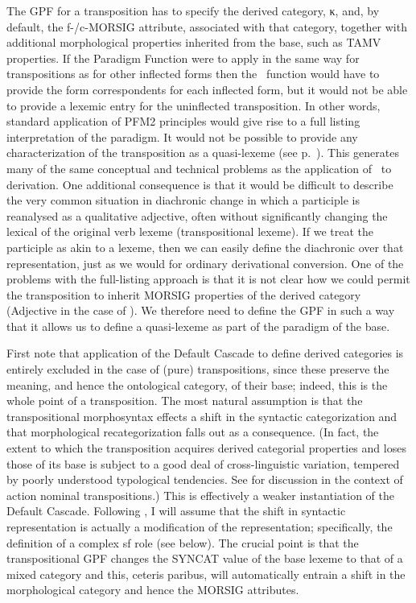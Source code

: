 \documentclass[output=paper,
modfonts
]{LSP/langsci}
\begin{document}
The GPF for a transposition has to specify the derived  category, κ, and, by default, the f-/c-MORSIG attribute, associated with that category, together with additional morphological properties inherited from the base, such as TAMV properties. If the Paradigm Function were to apply in the same way for transpositions as for other inflected forms then the \Corrfn\ function would have to provide the form correspondents for each inflected form, but it would not be able to provide a lexemic entry for the uninflected transposition. In other words, standard application of PFM2 principles would give rise to a full listing interpretation of the paradigm. It would not be possible to provide any characterization of the transposition as a quasi-lexeme (see p.~\pageref{quasilexeme}). %
This generates many of the same conceptual and technical problems as the application of \Corrfn\ to derivation. %
One additional consequence  is that  it would be difficult to describe the very common situation in diachronic change in which a participle is reanalysed as a qualitative adjective, often without significantly changing the lexical  of the original verb lexeme (transpositional lexeme). If we treat the participle as akin to a lexeme, then we can easily define the diachronic  over that representation, just as we would for ordinary derivational conversion. 
One of the problems with the full-listing approach is that it is not clear how we could  permit the transposition to inherit  MORSIG properties of the derived  category (Adjective in the case of ). We therefore need to define the GPF in such a way that it allows us to define a quasi-lexeme as part of the paradigm of the base.

First note that application of the Default Cascade to define derived categories is entirely excluded in the case of (pure) transpositions, since these preserve the meaning, and hence the ontological category, of their base; indeed, this is the whole point of a transposition. The most natural assumption is that  the transpositional morphosyntax effects a shift in the syntactic categorization and that morphological recategorization falls out as a consequence. (In fact, the extent to which the transposition acquires derived categorial properties and loses those of its base is subject to a good deal of cross-linguistic variation, tempered by poorly understood typological tendencies. See \citet{Malchukov04:book} for discussion in the context of  action nominal transpositions.) This is effectively a weaker instantiation of the Default Cascade.  Following \citet{Spencer99:transpositions,Spencer13:book}, I will assume that the shift in syntactic representation is actually a modification of the  representation; %
specifically, the definition of a complex sf role (see below). %
 The crucial point is  that the transpositional GPF changes the SYNCAT value of the base lexeme to that of a mixed category and  this, ceteris paribus, will automatically entrain a shift in the morphological category and hence the MORSIG attributes. 
\end{document}
